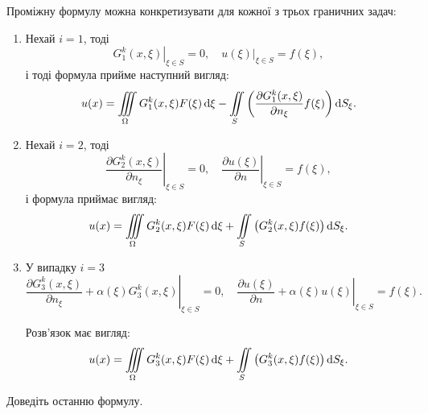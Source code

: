 Проміжну формулу можна конкретизувати для кожної з трьох граничних задач:
\begin{enumerate}
	\item Нехай $i = 1$, тоді
	\begin{equation}
		\left. G_1^k(x, \xi) \right|_{\xi \in S} = 0, \quad \left. u(\xi) \right|_{\xi \in S} = f(\xi),
	\end{equation}
	і тоді формула прийме наступний вигляд:
	\begin{equation}
		\label{eq:4.3.46}
		u(x) = \displaystyle\iiint\limits_\Omega G_1^k(x, \xi) F(\xi) \mathop{}\!\mathrm{d} \xi - \displaystyle\iint\limits_S \left( \frac{\partial G_1^k(x, \xi)}{\partial n_\xi} f(\xi) \right) \mathop{}\!\mathrm{d} S_\xi.
	\end{equation}

	\item Нехай $i = 2$, тоді 
	\begin{equation}
		\left. \frac{\partial G_2^k(x, \xi)}{\partial n_\xi} \right|_{\xi \in S} = 0, \quad \left. \frac{\partial u(\xi)}{\partial n} \right|_{\xi \in S} = f(\xi),
	\end{equation}
	і формула приймає вигляд:
	\begin{equation}
		\label{eq:4.3.47}
		u(x) = \displaystyle\iiint\limits_\Omega G_2^k(x, \xi) F(\xi) \mathop{}\!\mathrm{d} \xi + \displaystyle\iint\limits_S \left( G_2^k(x, \xi) f(\xi) \right) \mathop{}\!\mathrm{d} S_\xi.
	\end{equation}

	\item У випадку $i = 3$
	\begin{equation}
		\left. \frac{\partial G_3^k(x, \xi)}{\partial n_\xi} + \alpha(\xi) G_3^k(x, \xi) \right|_{\xi \in S} = 0, \quad \left. \frac{\partial u(\xi)}{\partial n} + \alpha(\xi) u(\xi) \right|_{\xi \in S} = f(\xi).
	\end{equation}

	Розв'язок має вигляд:
	\begin{equation}
		u(x) = \displaystyle\iiint\limits_\Omega G_3^k(x, \xi) F(\xi) \mathop{}\!\mathrm{d} \xi + \displaystyle\iint\limits_S \left( G_3^k(x, \xi) f(\xi) \right) \mathop{}\!\mathrm{d} S_\xi.
	\end{equation}
\end{enumerate}

\begin{exercise}
	Доведіть останню формулу.
\end{exercise}

